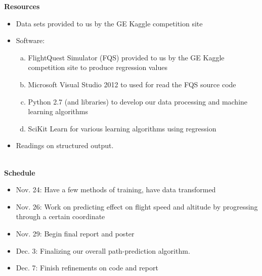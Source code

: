 \documentclass{article}[9pt]
\begin{document}
\noindent
\Large{\textbf{Resources}}
\begin{itemize}
	\item Data sets provided to us by the GE Kaggle competition site
	\item Software: 
		\begin{enumerate}[(a)]
			\item FlightQuest Simulator (FQS) provided to us by the GE Kaggle competition site to produce regression values
			\item Microsoft Visual Studio 2012 to used for read the FQS source code
			\item Python 2.7 (and libraries) to develop our data processing and machine learning algorithms
			\item SciKit Learn for various learning algorithms using regression
		\end{enumerate}
	\item Readings on structured output. 
\end{itemize}
\hspace*{\fill}\\
\Large{\textbf{Schedule}}
\noindent
\begin{itemize}
	\item Nov. 24: Have a few methods of training, have data transformed
	\item Nov. 26: Work on predicting effect on flight speed and altitude by progressing through a certain coordinate
	\item Nov. 29: Begin final report and poster
	\item Dec. 3: Finalizing our overall path-prediction algorithm.
	\item Dec. 7: Finish refinements on code and report 
\end{itemize}
\end{document}
